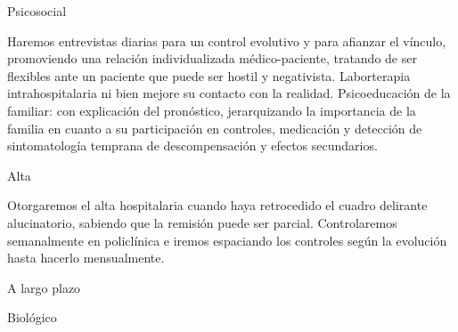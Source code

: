 Psicosocial

Haremos entrevistas diarias para un control evolutivo y para afianzar el vínculo, promoviendo una relación individualizada médico-paciente, tratando de ser flexibles ante un paciente que puede ser hostil y negativista. Laborterapia intrahospitalaria ni bien mejore su contacto con la realidad. Psicoeducación de la familiar: con explicación del pronóstico, jerarquizando la importancia de la familia en cuanto a su participación en controles, medicación y detección de sintomatología temprana de descompensación y efectos secundarios.

Alta

Otorgaremos el alta hospitalaria cuando haya retrocedido el cuadro delirante alucinatorio, sabiendo que la remisión puede ser parcial. Controlaremos semanalmente en policlínica e iremos espaciando los controles según la evolución hasta hacerlo mensualmente.

A largo plazo

Biológico

